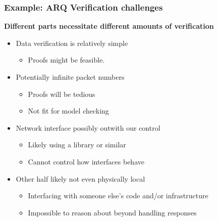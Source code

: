 \documentclass[compress,handout]{beamer}
\begin{document}
\begin{frame}
  \frametitle{Example: ARQ {\textendash} Verification challenges}

    \textbf{Different parts necessitate different amounts of verification}

    \begin{itemize}
      \item<1-> Data verification is relatively simple 
        \begin{itemize}
          \item<1-> Proofs might be feasible.
        \end{itemize}
      \item<2-> Potentially infinite packet numbers
        \begin{itemize}
          \item<3-> Proofs will be tedious
          \item<4-> Not fit for model checking
        \end{itemize}
      \item<5-> Network interface possibly outwith our control
        \begin{itemize}
          \item<6-> Likely using a library or similar
          \item<7-> Cannot control how interfaces behave
        \end{itemize}
      \item<8-> Other half likely not even physically local
        \begin{itemize}
          \item<9-> Interfacing with someone else's code and/or infrastructure
          \item<10-> Impossible to reason about beyond handling responses
        \end{itemize}
    \end{itemize}

\end{frame}
\end{document}
